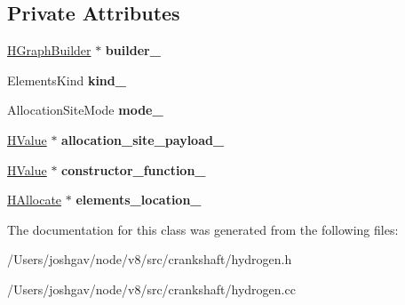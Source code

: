 \subsection*{Private Attributes}
\begin{DoxyCompactItemize}
\item 
\hyperlink{classv8_1_1internal_1_1_h_graph_builder}{H\+Graph\+Builder} $\ast$ {\bfseries builder\+\_\+}\hypertarget{classv8_1_1internal_1_1_h_graph_builder_1_1_j_s_array_builder_a96836c2ca22f6ed3df37eb5c1a8bc5b2}{}\label{classv8_1_1internal_1_1_h_graph_builder_1_1_j_s_array_builder_a96836c2ca22f6ed3df37eb5c1a8bc5b2}

\item 
Elements\+Kind {\bfseries kind\+\_\+}\hypertarget{classv8_1_1internal_1_1_h_graph_builder_1_1_j_s_array_builder_af679a78a6c390c357923d9e853dbe6ca}{}\label{classv8_1_1internal_1_1_h_graph_builder_1_1_j_s_array_builder_af679a78a6c390c357923d9e853dbe6ca}

\item 
Allocation\+Site\+Mode {\bfseries mode\+\_\+}\hypertarget{classv8_1_1internal_1_1_h_graph_builder_1_1_j_s_array_builder_a36b3e3859cc94cc8f24a31cc0ad1672e}{}\label{classv8_1_1internal_1_1_h_graph_builder_1_1_j_s_array_builder_a36b3e3859cc94cc8f24a31cc0ad1672e}

\item 
\hyperlink{classv8_1_1internal_1_1_h_value}{H\+Value} $\ast$ {\bfseries allocation\+\_\+site\+\_\+payload\+\_\+}\hypertarget{classv8_1_1internal_1_1_h_graph_builder_1_1_j_s_array_builder_ab1bd638a06823d6ba47da15dbce5943a}{}\label{classv8_1_1internal_1_1_h_graph_builder_1_1_j_s_array_builder_ab1bd638a06823d6ba47da15dbce5943a}

\item 
\hyperlink{classv8_1_1internal_1_1_h_value}{H\+Value} $\ast$ {\bfseries constructor\+\_\+function\+\_\+}\hypertarget{classv8_1_1internal_1_1_h_graph_builder_1_1_j_s_array_builder_a762836daba6a154da78387982026b81b}{}\label{classv8_1_1internal_1_1_h_graph_builder_1_1_j_s_array_builder_a762836daba6a154da78387982026b81b}

\item 
\hyperlink{classv8_1_1internal_1_1_h_allocate}{H\+Allocate} $\ast$ {\bfseries elements\+\_\+location\+\_\+}\hypertarget{classv8_1_1internal_1_1_h_graph_builder_1_1_j_s_array_builder_a2e6163dc0ff3e80308390dadd8925f97}{}\label{classv8_1_1internal_1_1_h_graph_builder_1_1_j_s_array_builder_a2e6163dc0ff3e80308390dadd8925f97}

\end{DoxyCompactItemize}


The documentation for this class was generated from the following files\+:\begin{DoxyCompactItemize}
\item 
/\+Users/joshgav/node/v8/src/crankshaft/hydrogen.\+h\item 
/\+Users/joshgav/node/v8/src/crankshaft/hydrogen.\+cc\end{DoxyCompactItemize}
